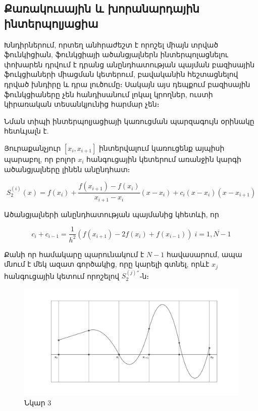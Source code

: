 \documentclass[fleqn, bachelor,subf,12pt,notitlepage]{disser}
\begin{document}
\newpage

\subsection*{Քառակուսային և խորանարդային ինտերպոլյացիա}

Խնդիրներում, որտեղ անհրաժեշտ է որոշել միայն տրված ֆունկիցիան, ֆունկցիայի ածանցյալներն ինտերպոլացնելու փոխարեն դրվում է դրանց անընդհատության պայման բազիսային ֆուկցիաների միացման կետերում,  բավականին հեշտացնելով դրված խնդիրը և դրա լուծումը։ Սակայն այս դեպքում բազիսային ֆունկցիաները չեն հանդիսանում լոկալ կրողներ, ուստի կիրառական տեսանկյունից հարմար չեն։

Նման տիպի ինտերպոլյացիայի կառուցման պարզագույն օրինակը հետևյալն է.

\noindent Յուրաքանչյուր $\left[x_{i}, x_{i+1}\right]$ ինտերվալում կառուցենք այպիսի պարաբոլ, որ բոլոր $x_{i}$ հանգուցային կետերում առանջին կարգի ածանցյալները լինեն անընդհատ։

$$S_{2}^{(i)}(x)=f(x_{i})+\dfrac{f(x_{i+1})-f(x_{i})}{x_{i+1}-x_{i}}\left(x-x_{i}\right)+c_{i}\left(x-x_{i}\right)\left(x-x_{i+1}\right)$$

\noindent Ածանցյալների անընդհատության պայմանից կհետևի, որ

$$c_{i}+c_{i-1}=\dfrac{1}{h^{2}}\left(f(x_{i+1})-2f(x_{i})+f(x_{i-1})\right) \; i=\overline{1, N-1}$$

Քանի որ համակարը պարունակում է $N-1$ հավասարում, ապա մնում է մեկ ազատ գործակից, որը կարելի գտնել, որևէ $x_{j}$ հանգուցային կետում որոշելով $S_{2}^{(j)''}$֊ն։

\begin{figure}[h!]
\centering
\includegraphics[width=1.0\textwidth]{images/one_var_non_hermite_1}
\captionsetup{labelformat=empty}
\caption{\hfill Նկար 3}
\end{figure}
\end{document}
